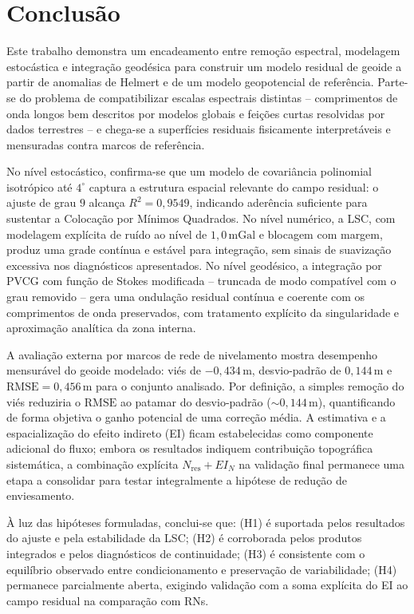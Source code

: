 \chapter{Conclusão}

\vspace{-16pt}

Este trabalho demonstra um encadeamento entre remoção espectral, modelagem estocástica e integração geodésica para construir um modelo residual de geoide a partir de anomalias de Helmert e de um modelo geopotencial de referência. Parte-se do problema de compatibilizar escalas espectrais distintas -- comprimentos de onda longos bem descritos por modelos globais e feições curtas resolvidas por dados terrestres -- e chega-se a superfícies residuais fisicamente interpretáveis e mensuradas contra marcos de referência.

No nível estocástico, confirma-se que um modelo de covariância polinomial isotrópico até $4^\circ$ captura a estrutura espacial relevante do campo residual: o ajuste de grau $9$ alcança $R^{2}=0{,}9549$, indicando aderência suficiente para sustentar a Colocação por Mínimos Quadrados. No nível numérico, a LSC, com modelagem explícita de ruído ao nível de $1{,}0\,\mathrm{mGal}$ e blocagem com margem, produz uma grade contínua e estável para integração, sem sinais de suavização excessiva nos diagnósticos apresentados. No nível geodésico, a integração por PVCG com função de Stokes modificada -- truncada de modo compatível com o grau removido -- gera uma ondulação residual contínua e coerente com os comprimentos de onda preservados, com tratamento explícito da singularidade e aproximação analítica da zona interna.

A avaliação externa por marcos de rede de nivelamento mostra desempenho mensurável do geoide modelado: viés de $-0{,}434$\,m, desvio-padrão de $0{,}144$\,m e $\mathrm{RMSE}=0{,}456$\,m para o conjunto analisado. Por definição, a simples remoção do viés reduziria o $\mathrm{RMSE}$ ao patamar do desvio-padrão ($\sim 0{,}144$\,m), quantificando de forma objetiva o ganho potencial de uma correção média. A estimativa e a espacialização do efeito indireto (EI) ficam estabelecidas como componente adicional do fluxo; embora os resultados indiquem contribuição topográfica sistemática, a combinação explícita $N_{\text{res}}+EI_N$ na validação final permanece uma etapa a consolidar para testar integralmente a hipótese de redução de enviesamento.

À luz das hipóteses formuladas, conclui-se que: (H1) é suportada pelos resultados do ajuste e pela estabilidade da LSC; (H2) é corroborada pelos produtos integrados e pelos diagnósticos de continuidade; (H3) é consistente com o equilíbrio observado entre condicionamento e preservação de variabilidade; (H4) permanece parcialmente aberta, exigindo validação com a soma explícita do EI ao campo residual na comparação com RNs.

